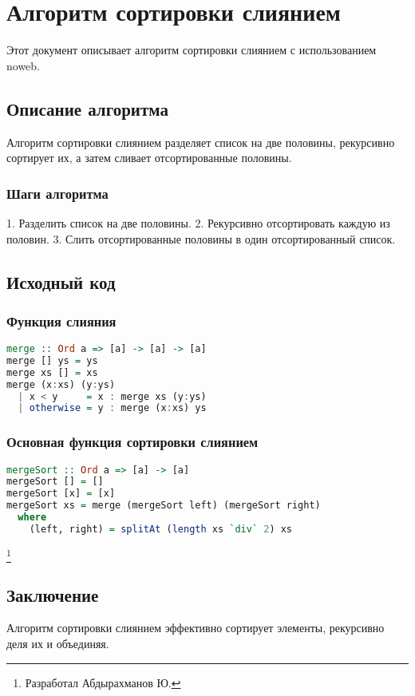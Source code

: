 \documentclass{report}
\begin{document}
\chapter{Алгоритм сортировки слиянием}

Этот документ описывает алгоритм сортировки слиянием с использованием noweb.

\section{Описание алгоритма}

Алгоритм сортировки слиянием разделяет список на две половины, рекурсивно сортирует их, а затем сливает отсортированные половины.

\subsection{Шаги алгоритма}

1. Разделить список на две половины.
2. Рекурсивно отсортировать каждую из половин.
3. Слить отсортированные половины в один отсортированный список.

\section{Исходный код}

\subsection{Функция слияния}

\begin{lstlisting}[language=Haskell]
merge :: Ord a => [a] -> [a] -> [a]
merge [] ys = ys
merge xs [] = xs
merge (x:xs) (y:ys)
  | x < y     = x : merge xs (y:ys)
  | otherwise = y : merge (x:xs) ys
\end{lstlisting}

\subsection{Основная функция сортировки слиянием}

\begin{lstlisting}[language=Haskell]
mergeSort :: Ord a => [a] -> [a]
mergeSort [] = []
mergeSort [x] = [x]
mergeSort xs = merge (mergeSort left) (mergeSort right)
  where
    (left, right) = splitAt (length xs `div` 2) xs
\end{lstlisting}
\footnote{Разработал Абдырахманов Ю.} 
\section{Заключение}

Алгоритм сортировки слиянием эффективно сортирует элементы, рекурсивно деля их и объединяя.
\end{document}
